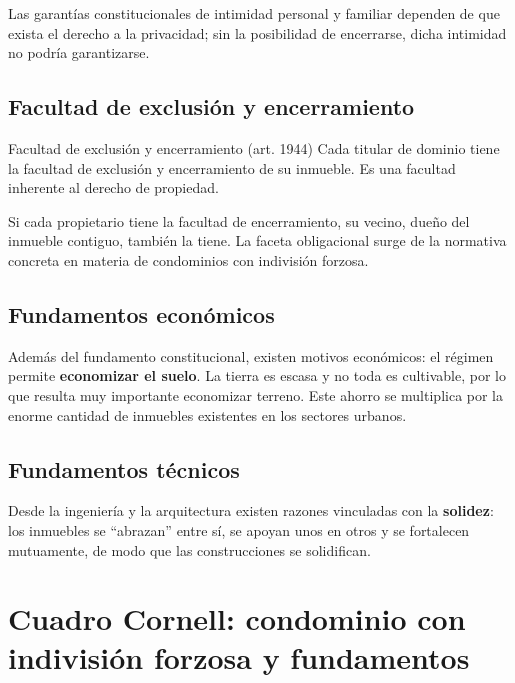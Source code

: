 \documentclass[12pt,oneside]{book}
\begin{document}
Las garantías constitucionales de intimidad personal y familiar dependen de que exista el derecho a la privacidad; sin la posibilidad de encerrarse, dicha intimidad no podría garantizarse.

\subsection{Facultad de exclusión y encerramiento}

\begin{definition}{Facultad de exclusión y encerramiento (art. 1944)}
Cada titular de dominio tiene la facultad de exclusión y encerramiento de su inmueble. Es una facultad inherente al derecho de propiedad.
\end{definition}

Si cada propietario tiene la facultad de encerramiento, su vecino, dueño del inmueble contiguo, también la tiene. La faceta obligacional surge de la normativa concreta en materia de condominios con indivisión forzosa.

\subsection{Fundamentos económicos}

Además del fundamento constitucional, existen motivos económicos: el régimen permite \textbf{economizar el suelo}. La tierra es escasa y no toda es cultivable, por lo que resulta muy importante economizar terreno. Este ahorro se multiplica por la enorme cantidad de inmuebles existentes en los sectores urbanos.

\subsection{Fundamentos técnicos}

Desde la ingeniería y la arquitectura existen razones vinculadas con la \textbf{solidez}: los inmuebles se ``abrazan'' entre sí, se apoyan unos en otros y se fortalecen mutuamente, de modo que las construcciones se solidifican.

\section{Cuadro Cornell: condominio con indivisión forzosa y fundamentos}
\end{document}

